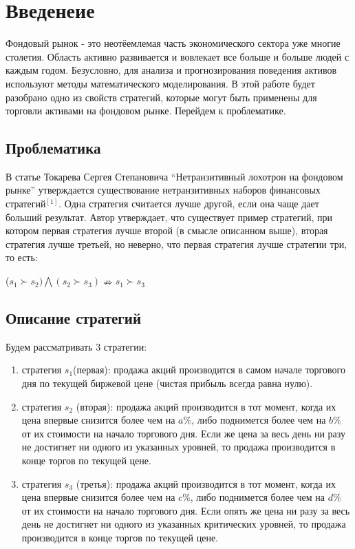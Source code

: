 \chapter{Введенеие}

Фондовый рынок - это неотёемлемая часть экономического сектора уже многие столетия. Область активно развивается и вовлекает все больше и больше людей с каждым годом. Безусловно, для анализа и прогнозирования поведения активов используют методы математического моделирования. В этой работе будет разобрано одно из свойств стратегий, которые могут быть применены для торговли активами на фондовом рынке. Перейдем к проблематике.

\section{Проблематика}

В статье Токарева Сергея Степановича “Нетранзитивный лохотрон на фондовом рынке” утверждается существование нетранзитивных наборов финансовых стратегий$^{[1]}$. Одна стратегия считается лучше другой, если она чаще дает больший результат. Автор утверждает, что существует пример стратегий, при котором первая стратегия лучше второй (в смысле описанном выше), вторая стратегия лучше третьей, но неверно, что первая стратегия лучше стратегии три, то есть:

\begin{center}
($s_1 \succ s_2) \bigwedge (s_2 \succ s_3) \nRightarrow s_1 \succ s_3$
\end{center}

\section{Описание стратегий}

Будем рассматривать 3 стратегии:
\begin{enumerate}
\item стратегия $s_1$(первая): продажа акций производится в самом начале торгового дня по текущей биржевой цене (чистая прибыль всегда равна нулю).
\item стратегия $s_2$ (вторая): продажа акций производится в тот момент, когда их цена впервые снизится более чем на $a\%$, либо поднимется более чем на $b\%$ от их стоимости на начало торгового дня. Если же цена за весь день ни разу не достигнет ни одного из указанных уровней, то продажа производится в конце торгов по текущей цене.
\item стратегия $s_3$ (третья): продажа акций производится в тот момент, когда их цена впервые снизится более чем на $c\%$, либо поднимется более чем на $d\%$ от их стоимости на начало торгового дня. Если опять же цена ни разу за весь день не достигнет ни одного из указанных критических уровней, то продажа производится в конце торгов по текущей цене.
\end{enumerate}

